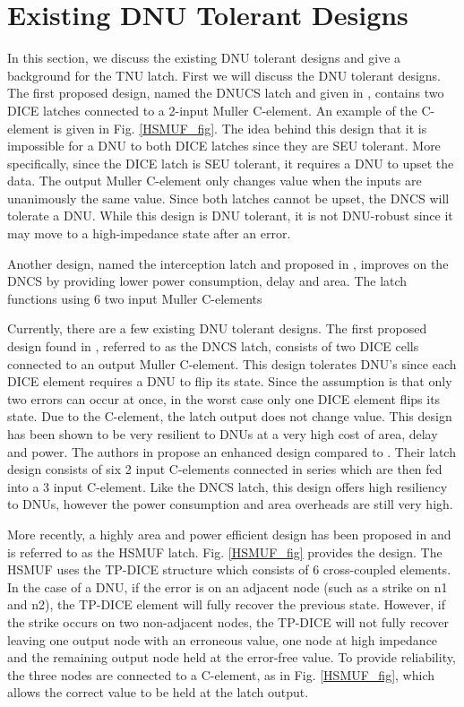 \section{Existing DNU Tolerant Designs} \label{sec:DNUdes}

In this section, we discuss the existing DNU tolerant designs and give a background for the TNU latch. First we will discuss the DNU tolerant designs. The first proposed design, named the DNUCS latch and given in \cite{DNCS}, contains two DICE latches connected to a 2-input Muller C-element. An example of the C-element is given in Fig. \ref{HSMUF_fig}. The idea behind this design that it is impossible for a DNU to both DICE latches since they are SEU tolerant. More specifically, since the DICE latch is SEU tolerant, it requires a DNU to upset the data. The output Muller C-element only changes value when the inputs are unanimously the same value. Since both latches cannot be upset, the DNCS will tolerate a DNU. While this design is DNU tolerant, it is not DNU-robust since it may move to a high-impedance state after an error. 

Another design, named the interception latch and proposed in \cite{Inter}, improves on the DNCS by providing lower power consumption, delay and area. The latch functions using 6 two input Muller C-elements 

Currently, there are a few existing DNU tolerant designs. The first proposed design found in \cite{DNCS}, referred to as the DNCS latch, consists of two DICE cells connected to an output Muller C-element. This design tolerates DNU's since each DICE element requires a DNU to flip its state. Since the assumption is that only two errors can occur at once, in the worst case only one DICE element flips its state. Due to the C-element, the latch output does not change value. This design has been shown to be very resilient to DNUs at a very high cost of area, delay and power. The authors in \cite{Inter} propose an enhanced design compared to \cite{DNCS}. Their latch design consists of six 2 input C-elements connected in series which are then fed into a 3 input C-element. Like the DNCS latch, this design offers high resiliency to DNUs, however the power consumption and area overheads are still very high. 

More recently, a highly area and power efficient design has been proposed in \cite{HSMUF} and is referred to as the HSMUF latch. Fig. \ref{HSMUF_fig} provides the design. The HSMUF uses the TP-DICE \cite{TPDICE} structure which consists of 6 cross-coupled elements. In the case of a DNU, if the error is on an adjacent node (such as a strike on n1 and n2), the TP-DICE element will fully recover the previous state. However, if the strike occurs on two non-adjacent nodes, the TP-DICE will not fully recover leaving one output node with an erroneous value, one node at high impedance and the remaining output node held at the error-free value. To provide reliability, the three nodes are connected to a C-element, as in Fig. \ref{HSMUF_fig}, which allows the correct value to be held at the latch output. 

